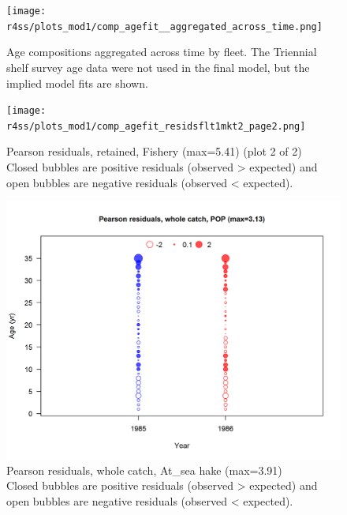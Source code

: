 \documentclass[12pt,]{article}
\begin{document}
\FloatBarrier

\begin{figure}
\centering
\texttt{[image: r4ss/plots\_mod1/comp\_agefit\_\_aggregated\_across\_time.png]}
\caption{Age compositions aggregated across time by fleet. The Triennial
shelf survey age data were not used in the final model, but the implied
model fits are shown. \label{fig:age_agg}}
\end{figure}

\begin{figure}
\centering
\texttt{[image: r4ss/plots\_mod1/comp\_agefit\_residsflt1mkt2\_page2.png]}
\caption{Pearson residuals, retained, Fishery (max=5.41) (plot 2 of 2)\\
Closed bubbles are positive residuals (observed \textgreater{} expected)
and open bubbles are negative residuals (observed \textless{} expected).
\label{fig:fishery_age_pearson}}
\end{figure}

\begin{figure}
\centering
\includegraphics{r4ss/plots_mod1/comp_agefit_residsflt2mkt0.png}
\caption{Pearson residuals, whole catch, At\_sea hake (max=3.91)\\
Closed bubbles are positive residuals (observed \textgreater{} expected)
and open bubbles are negative residuals (observed \textless{} expected).
\label{fig:ashop_age_pearson}}
\end{figure}
\end{document}
